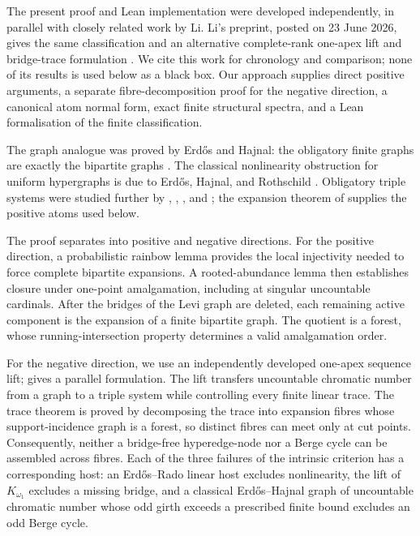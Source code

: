 \documentclass[a4paper,11pt,reqno]{amsart}
\theoremstyle{plain}
\theoremstyle{definition}
\theoremstyle{remark}
\begin{document}
The present proof and Lean implementation were developed independently, in
parallel with closely related work by Li.  Li's preprint, posted on 23 June
2026, gives the same classification \citep[Theorem~1.1]{li2026} and an
alternative complete-rank one-apex lift and bridge-trace formulation
\citep[Sections~3--4 and Theorem~4.6]{li2026}.  We cite this work for
chronology and comparison; none of its results is used below as a black box.
Our approach supplies direct positive arguments, a separate
fibre-decomposition proof for the negative direction, a canonical atom normal
form, exact finite structural spectra, and a Lean formalisation of the finite
classification.

The graph analogue was proved by Erdős and Hajnal: the obligatory finite
graphs are exactly the bipartite graphs
\citep[Corollary~5.6 and Theorem~7.4]{erdoshajnal1966}.  The classical
nonlinearity obstruction for uniform hypergraphs is due to Erdős, Hajnal,
and Rothschild \citep[Theorem~2, p.~532]{ehr1973}.  Obligatory triple
systems were studied further by \citet{egh1975}, \citet{komjath2001},
\citet{hajnalkomjath2008}, and \citet{komjath2008}; the expansion theorem of
\citet[Theorem~1.2]{reiher2024} supplies the positive atoms used below.

The proof separates into positive and negative directions.  For the positive
direction, a probabilistic rainbow lemma provides the local injectivity
needed to force complete bipartite expansions.  A rooted-abundance lemma then
establishes closure under one-point amalgamation, including at singular
uncountable cardinals.  After the bridges of the Levi graph are deleted, each
remaining active component is the expansion of a finite bipartite graph.  The
quotient is a forest, whose running-intersection property determines a valid
amalgamation order.

For the negative direction, we use an independently developed one-apex
sequence lift; \citet[Sections~3--4]{li2026} gives a parallel formulation.
The lift transfers uncountable chromatic
number from a graph to a triple system while controlling every finite linear
trace.  The trace theorem is proved by decomposing the trace into expansion
fibres whose support-incidence graph is a forest, so distinct fibres can meet
only at cut points.  Consequently, neither a bridge-free hyperedge-node nor a
Berge cycle can be assembled across fibres.  Each of the three failures of
the intrinsic criterion has a corresponding host: an Erdős--Rado linear host
excludes nonlinearity, the lift of $K_{\omega_1}$ excludes a missing bridge,
and a classical Erdős--Hajnal graph of uncountable chromatic number whose odd
girth exceeds a prescribed finite bound excludes an odd Berge cycle.
\end{document}

